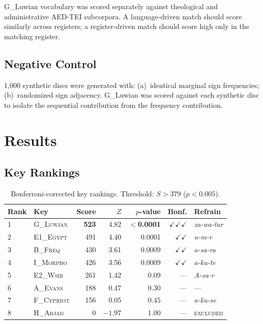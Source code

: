 \documentclass[12pt,a4paper]{article}
\begin{document}
G\_Luwian vocabulary was scored separately against theological and administrative AED-TEI subcorpora. A language-driven match should score similarly across registers; a register-driven match should score high only in the matching register.

\subsection{Negative Control}

1,000 synthetic discs were generated with: (a)~identical marginal sign frequencies; (b)~randomized sign adjacency. G\_Luwian was scored against each synthetic disc to isolate the sequential contribution from the frequency contribution.

\section{Results}

\subsection{Key Rankings}

\begin{table}[h]
\centering
\caption{Bonferroni-corrected key rankings. Threshold: $S > 379$ ($p < 0.005$).}
\begin{tabular}{llrrrrl}
\toprule
Rank & Key & Score & $Z$ & $p$-value & Bonf. & Refrain \\
\midrule
1 & \textsc{G\_Luwian} & \textbf{523} & 4.82 & \textbf{$<$0.0001} & $\checkmark\checkmark\checkmark$ & \textit{za-wa-tar} \\
2 & \textsc{E1\_Egypt}  & 491 & 4.40 & 0.0001  & $\checkmark\checkmark$ & \textit{n-m-r} \\
3 & \textsc{B\_Freq}    & 430 & 3.61 & 0.0009  & $\checkmark\checkmark$ & \textit{a-sa-ra} \\
4 & \textsc{I\_Morpho}  & 426 & 3.56 & 0.0009  & $\checkmark\checkmark$ & \textit{a-ku-te} \\
5 & \textsc{E2\_Wsir}   & 261 & 1.42 & 0.09    & ---  & \textit{A-sa-r} \\
6 & \textsc{A\_Evans}   & 188 & 0.47 & 0.30    & ---  & --- \\
7 & \textsc{F\_Cypriot} & 156 & 0.05 & 0.45    & ---  & \textit{a-ku-se} \\
8 & \textsc{H\_Abjad}   & 0   & $-1.97$ & 1.00 & ---  & \textsc{excluded} \\
\bottomrule
\end{tabular}
\end{table}
\end{document}
